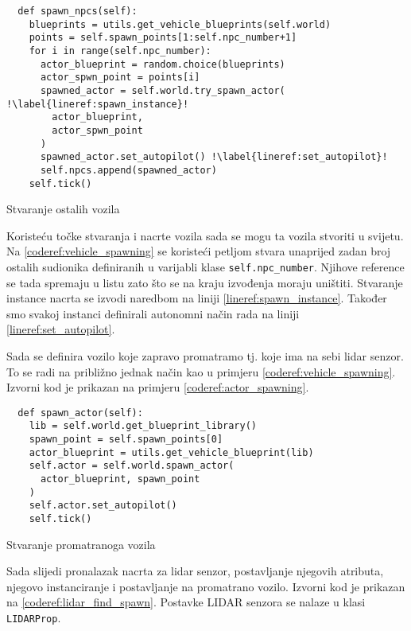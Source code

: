 \begin{listing}[h!]
  \begin{verbatim}
  def spawn_npcs(self):
    blueprints = utils.get_vehicle_blueprints(self.world)
    points = self.spawn_points[1:self.npc_number+1]
    for i in range(self.npc_number):
      actor_blueprint = random.choice(blueprints)
      actor_spwn_point = points[i]
      spawned_actor = self.world.try_spawn_actor( !\label{lineref:spawn_instance}!
        actor_blueprint,
        actor_spwn_point
      )
      spawned_actor.set_autopilot() !\label{lineref:set_autopilot}!
      self.npcs.append(spawned_actor)
    self.tick()
  \end{verbatim}
  \caption{Stvaranje ostalih vozila}
  \label{coderef:vehicle_spawning}
\end{listing}

Koristeću točke stvaranja i nacrte vozila sada se mogu ta vozila stvoriti u svijetu. Na \ref{coderef:vehicle_spawning} se koristeći petljom stvara unaprijed zadan broj ostalih sudionika definiranih u varijabli klase \texttt{self.npc_number}. Njihove reference se tada spremaju u listu zato što se na kraju izvođenja moraju uništiti. Stvaranje instance nacrta se izvodi naredbom na liniji \ref{lineref:spawn_instance}. Također smo svakoj instanci definirali autonomni način rada na liniji \ref{lineref:set_autopilot}.

Sada se definira vozilo koje zapravo promatramo tj. koje ima na sebi lidar senzor. To se radi na približno jednak način kao u primjeru \ref{coderef:vehicle_spawning}. Izvorni kod je prikazan na primjeru \ref{coderef:actor_spawning}.


\begin{listing}[h!]
  \begin{verbatim}
  def spawn_actor(self):
    lib = self.world.get_blueprint_library()
    spawn_point = self.spawn_points[0]
    actor_blueprint = utils.get_vehicle_blueprint(lib)
    self.actor = self.world.spawn_actor(
      actor_blueprint, spawn_point
    )
    self.actor.set_autopilot()
    self.tick()
  \end{verbatim}
  \caption{Stvaranje promatranoga vozila}
  \label{coderef:actor_spawning}
\end{listing}

Sada slijedi pronalazak nacrta za lidar senzor, postavljanje njegovih atributa, njegovo instanciranje i postavljanje na promatrano vozilo. Izvorni kod je prikazan na \ref{coderef:lidar_find_spawn}. Postavke LIDAR senzora se nalaze u klasi \texttt{LIDARProp}.



